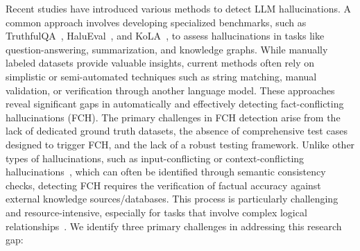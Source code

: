 Recent studies have introduced various methods to detect LLM hallucinations. A common approach involves developing specialized benchmarks, such as TruthfulQA~\cite{lin-etal-2022-truthfulqa}, HaluEval~\cite{HaluEval}, and KoLA~\cite{yu2023kola}, to assess hallucinations in tasks like question-answering, summarization, and knowledge graphs. 
While manually labeled datasets provide valuable insights, current methods often rely on simplistic or semi-automated techniques such as string matching, manual validation, or verification through another language model. These approaches reveal significant gaps in automatically and effectively detecting fact-conflicting hallucinations (FCH). 
The primary challenges in FCH detection arise from the lack of dedicated ground truth datasets, the absence of comprehensive test cases designed to trigger FCH, and the lack of a robust testing framework.  
Unlike other types of hallucinations, such as input-conflicting or context-conflicting hallucinations~\cite{ji-etal-2023-rho, shi2023large}, which can often be identified through semantic consistency checks, detecting FCH requires the verification of factual accuracy against external knowledge sources/databases. This process is particularly challenging and resource-intensive, especially for tasks that involve complex logical relationships~\cite{zhang2024fusion}. We identify three primary challenges in addressing this research gap:






